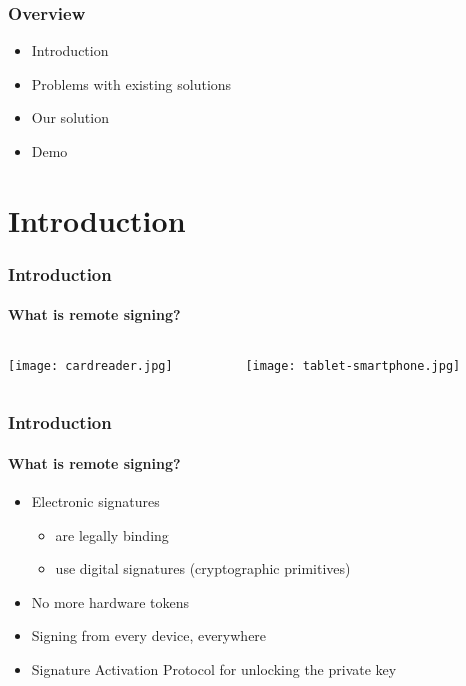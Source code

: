 \begin{frame}
  \titlepage
\end{frame}

\begin{frame}[c] \frametitle{Overview}
  \begin{itemize} \setlength{\itemsep}{18pt}
    \item Introduction
    \item Problems with existing solutions
    \item Our solution
    \item Demo
  \end{itemize}
\end{frame}

\section{Introduction}
\sectionpage

\begin{frame}[t]\frametitle{Introduction}
 \framesubtitle{What is remote signing?}
 \begin{columns}[T]
	\begin{column}{0.5\textwidth}
		\texttt{[image: cardreader.jpg]}
	\end{column}
	\begin{column}{0.5\textwidth}
		\texttt{[image: tablet-smartphone.jpg]}
	\end{column}
 \end{columns}
\end{frame}

\begin{frame}[t]\frametitle{Introduction}
 \framesubtitle{What is remote signing?}
  \begin{itemize}
    \item Electronic signatures
    \begin{itemize}
      \item are legally binding
	  \item use digital signatures (cryptographic primitives)
    \end{itemize}
    \item No more hardware tokens
    \item Signing from every device, everywhere
    \item Signature Activation Protocol for unlocking the private key
  \end{itemize}
\end{frame}

